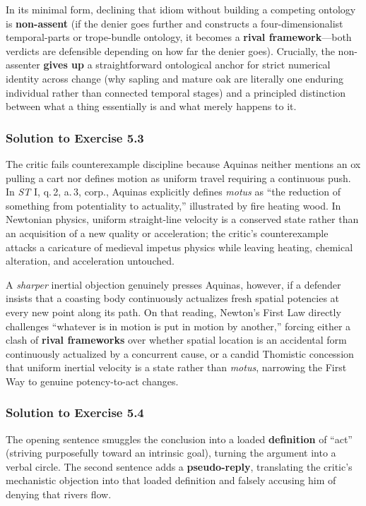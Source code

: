 In its minimal form, declining that idiom without building a competing ontology is \textbf{non-assent} (if the denier goes further and constructs a four-dimensionalist temporal-parts or trope-bundle ontology, it becomes a \textbf{rival framework}---both verdicts are defensible depending on how far the denier goes). Crucially, the non-assenter \textbf{gives up} a straightforward ontological anchor for strict numerical identity across change (why sapling and mature oak are literally one enduring individual rather than connected temporal stages) and a principled distinction between what a thing essentially is and what merely happens to it.

\subsubsection*{Solution to Exercise 5.3}
The critic fails counterexample discipline because Aquinas neither mentions an ox pulling a cart nor defines motion as uniform travel requiring a continuous push. In \emph{ST} I, q.\,2, a.\,3, corp., Aquinas explicitly defines \emph{motus} as ``the reduction of something from potentiality to actuality,'' illustrated by fire heating wood. In Newtonian physics, uniform straight-line velocity is a conserved state rather than an acquisition of a new quality or acceleration; the critic's counterexample attacks a caricature of medieval impetus physics while leaving heating, chemical alteration, and acceleration untouched.

A \emph{sharper} inertial objection genuinely presses Aquinas, however, if a defender insists that a coasting body continuously actualizes fresh spatial potencies at every new point along its path. On that reading, Newton's First Law directly challenges ``whatever is in motion is put in motion by another,'' forcing either a clash of \textbf{rival frameworks} over whether spatial location is an accidental form continuously actualized by a concurrent cause, or a candid Thomistic concession that uniform inertial velocity is a state rather than \emph{motus}, narrowing the First Way to genuine potency-to-act changes.

\subsubsection*{Solution to Exercise 5.4}
The opening sentence smuggles the conclusion into a loaded \textbf{definition} of ``act'' (striving purposefully toward an intrinsic goal), turning the argument into a verbal circle. The second sentence adds a \textbf{pseudo-reply}, translating the critic's mechanistic objection into that loaded definition and falsely accusing him of denying that rivers flow.

